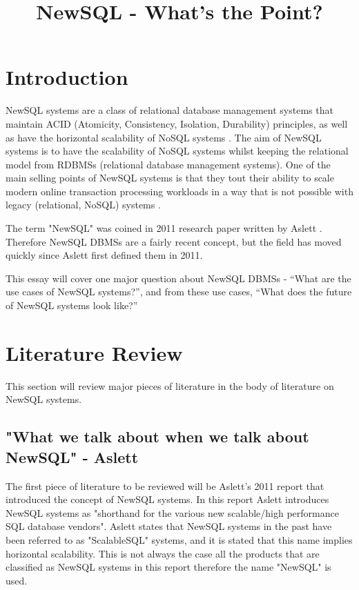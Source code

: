 \documentclass[10pt, conference]{IEEEtran}
\begin{document}
\title{NewSQL - What's the Point?}
\author{
}
\maketitle

\section{Introduction}

NewSQL systems are a class of relational database management systems that maintain ACID (Atomicity, Consistency, Isolation, Durability)  principles, as well as have the horizontal scalability of NoSQL systems \cite{pavlo}. The aim of NewSQL systems is to have the scalability of NoSQL systems whilst keeping the relational model from RDBMSs (relational database management systems). One of the main selling points of NewSQL systems is that they tout their ability to scale modern online transaction processing workloads in a way that is not possible with legacy (relational, NoSQL) systems \cite{pavlo}.

The term "NewSQL" was coined in 2011 research paper written by Aslett \cite{aslett}. Therefore NewSQL DBMSs are a fairly recent concept, but the field has moved quickly since Aslett first defined them in 2011.

This essay will cover one major question about NewSQL DBMSs - ``What are the use cases of NewSQL systems?'', and from these use cases, ``What does the future of NewSQL systems look like?''



\section{Literature Review}

This section will review major pieces of literature in the body of literature on NewSQL systems.

\subsection{"What we talk about when we talk about NewSQL" - Aslett}

The first piece of literature to be reviewed will be Aslett's 2011 report \cite{aslett} that introduced the concept of NewSQL systems. In this report Aslett introduces NewSQL systems as "shorthand for the various new scalable/high performance SQL database vendors". Aslett states that NewSQL systems in the past have been referred to as "ScalableSQL" systems, and it is stated that this name implies horizontal scalability. This is not always the case all the products that are classified as NewSQL systems in this report therefore the name "NewSQL" is used. 
\end{document}
